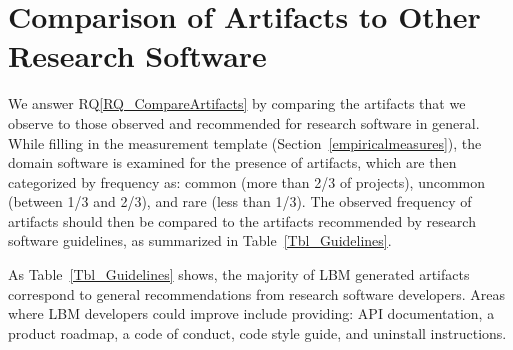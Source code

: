 \documentclass[runningheads]{llncs}
\newcommand{\rqref}[1]{RQ\ref{#1}}
\begin{document}
\section{Comparison of Artifacts to Other Research Software}
\label{Sec_CompareArtifacts}

We answer \rqref{RQ_CompareArtifacts} by comparing the artifacts that we observe
to those observed and recommended for research software in general.  While
filling in the measurement template (Section~\ref{empiricalmeasures}), the
domain software is examined for the presence of artifacts, which are then
categorized by frequency as: common (more than 2/3 of projects), uncommon
(between 1/3 and 2/3), and rare (less than 1/3). The observed frequency of
artifacts should then be compared to the artifacts recommended by research
software guidelines, as summarized in Table~\ref{Tbl_Guidelines}.  

As Table~\ref{Tbl_Guidelines} shows, the majority of LBM generated artifacts
correspond to general recommendations from research software developers.  Areas
where LBM developers could improve include providing: API documentation, a
product roadmap, a code of conduct, code style guide, and uninstall
instructions.
\end{document}
